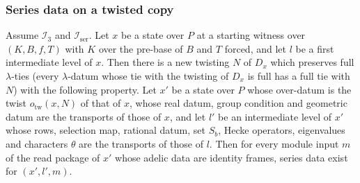 \subsubsection{Series data on a twisted copy}

\begin{proposition}\label{pf:baselat2:sercopy}
Assume $\mathcal I_3$ and $\mathcal I_{\mathrm{ser}}$. Let $x$ be a state over $P$ at a starting witness over
$(K,B,f,T)$ with $K$ over the pre-base of $B$ and $T$ forced, and let $l$ be a first intermediate level of
$x$. Then there is a new twisting $N$ of $D_x$ which preserves full $\lambda$-ties (every $\lambda$-datum whose tie
with the twisting of $D_x$ is full has a full tie with $N$) with the following property. Let $x'$ be a state
over $P$ whose over-datum is the twist $o_{\mathrm{tw}}(x,N)$ of that of $x$, whose real datum, group condition
and geometric datum are the transports of those of $x$, and let $l'$ be an intermediate level of $x'$ whose
rows, selection map, rational datum, set $S_b$, Hecke operators, eigenvalues and characters $\theta$ are the
transports of those of $l$. Then for every module input $m$ of the read package of $x'$ whose adelic data
are identity frames, series data exist for $(x',l',m)$.
\end{proposition}

